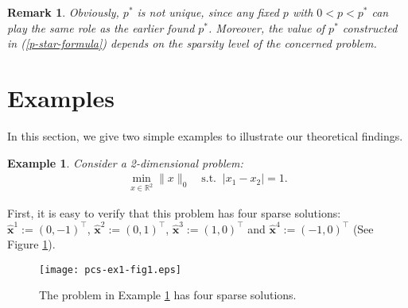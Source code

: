\documentclass[12pt]{article}
\newtheorem{Remark}{Remark}[part]
\newtheorem{Example}{Example}[part]
\begin{document}
\begin{Remark}
Obviously, $p^\ast$ is not unique, since any fixed $p$ with $0<p<p^\ast$ can play the same role as the earlier found $p^\ast$. Moreover, the value of $p^\ast$ constructed in (\ref{p-star-formula}) depends on the sparsity level of the concerned problem.
\end{Remark}


\section{Examples}
\setcounter{equation}{0} \setcounter{Assumption}{0}
\setcounter{Theorem}{0} \setcounter{Proposition}{0}
\setcounter{Corollary}{0} \setcounter{Lemma}{0}
\setcounter{Definition}{0} \setcounter{Remark}{0}
\setcounter{Algorithm}{0} \setcounter{Example}{0}

\hspace{4mm} In this section, we give two simple examples to illustrate our theoretical findings.

\begin{Example}\label{example1-lp-solve-sparse}
Consider a 2-dimensional problem:
\begin{eqnarray}\label{e-exam1-1}
\min\limits_{x\in \mathbb{R}^2}\| x \|_0\quad \textrm{s.t.}\;\; |x_1-x_2|=1.
\end{eqnarray}
\end{Example}

First, it is easy to verify that this problem has four sparse solutions: $\hat{\mathbf{x}}^1:=(0,-1)^\top$, $\hat{\mathbf{x}}^2:=(0,1)^\top$, $\hat{\mathbf{x}}^3:=(1,0)^\top$ and $\hat{\mathbf{x}}^4:=(-1,0)^\top$ (See Figure \ref{examples1-1}).

\begin{figure}[ht]
\centering
\texttt{[image: pcs-ex1-fig1.eps]}
\caption{The problem in Example \ref{example1-lp-solve-sparse} has four sparse solutions.}
\label{examples1-1}
\end{figure}
\end{document}
